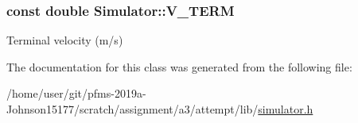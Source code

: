 \subsubsection[{\texorpdfstring{V\+\_\+\+T\+E\+RM}{V_TERM}}]{\setlength{\rightskip}{0pt plus 5cm}const double Simulator\+::\+V\+\_\+\+T\+E\+RM\hspace{0.3cm}{\ttfamily [static]}}\hypertarget{classSimulator_ad903010cfc404794ecfbb2f8903b15ae}{}\label{classSimulator_ad903010cfc404794ecfbb2f8903b15ae}
Terminal velocity (m/s) 

The documentation for this class was generated from the following file\+:\begin{DoxyCompactItemize}
\item 
/home/user/git/pfms-\/2019a-\/\+Johnson15177/scratch/assignment/a3/attempt/lib/\hyperlink{simulator_8h}{simulator.\+h}\end{DoxyCompactItemize}
